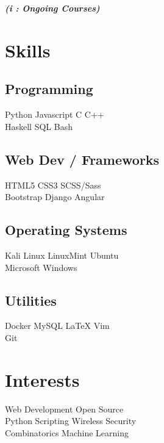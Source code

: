 \documentclass[]{deedy-resume-openfont}
\begin{document}
\begin{minipage}[t]{0.33\textwidth}
{\footnotesize \textit{\textbf{ (\textit{i} : Ongoing Courses)}}}


\section{Skills}
\subsection{Programming}
Python \textbullet{} Javascript \textbullet{} C \textbullet{} C++ \\  
 \vspace{0.1 cm}
Haskell \textbullet{} SQL \textbullet{} Bash \\
\vspace{0.3 cm} 
\subsection{Web Dev / Frameworks}
HTML5 \textbullet{} CSS3 \textbullet{}  SCSS/Sass \\ 
Bootstrap \textbullet{} Django \textbullet{} Angular \\
\vspace{0.3 cm}
\subsection{Operating Systems}
Kali Linux \textbullet{} LinuxMint \textbullet{} Ubuntu \\
Microsoft Windows
\vspace{0.3 cm}
\subsection{Utilities}
Docker \textbullet{} MySQL \textbullet{} \LaTeX{} \textbullet{} Vim \\
Git  \\


\section{Interests}
Web Development \textbullet{}Open Source \\
Python Scripting \textbullet{} Wireless Security \\
Combinatorics  \textbullet{} Machine Learning\\
%
%

\end{minipage} 
\end{document}

